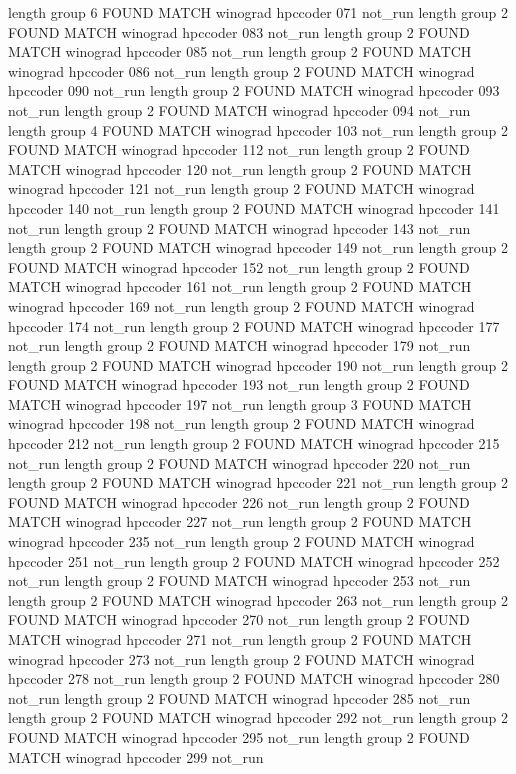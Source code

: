 length group  6
FOUND MATCH winograd hpccoder 071 not_run
length group  2
FOUND MATCH winograd hpccoder 083 not_run
length group  2
FOUND MATCH winograd hpccoder 085 not_run
length group  2
FOUND MATCH winograd hpccoder 086 not_run
length group  2
FOUND MATCH winograd hpccoder 090 not_run
length group  2
FOUND MATCH winograd hpccoder 093 not_run
length group  2
FOUND MATCH winograd hpccoder 094 not_run
length group  4
FOUND MATCH winograd hpccoder 103 not_run
length group  2
FOUND MATCH winograd hpccoder 112 not_run
length group  2
FOUND MATCH winograd hpccoder 120 not_run
length group  2
FOUND MATCH winograd hpccoder 121 not_run
length group  2
FOUND MATCH winograd hpccoder 140 not_run
length group  2
FOUND MATCH winograd hpccoder 141 not_run
length group  2
FOUND MATCH winograd hpccoder 143 not_run
length group  2
FOUND MATCH winograd hpccoder 149 not_run
length group  2
FOUND MATCH winograd hpccoder 152 not_run
length group  2
FOUND MATCH winograd hpccoder 161 not_run
length group  2
FOUND MATCH winograd hpccoder 169 not_run
length group  2
FOUND MATCH winograd hpccoder 174 not_run
length group  2
FOUND MATCH winograd hpccoder 177 not_run
length group  2
FOUND MATCH winograd hpccoder 179 not_run
length group  2
FOUND MATCH winograd hpccoder 190 not_run
length group  2
FOUND MATCH winograd hpccoder 193 not_run
length group  2
FOUND MATCH winograd hpccoder 197 not_run
length group  3
FOUND MATCH winograd hpccoder 198 not_run
length group  2
FOUND MATCH winograd hpccoder 212 not_run
length group  2
FOUND MATCH winograd hpccoder 215 not_run
length group  2
FOUND MATCH winograd hpccoder 220 not_run
length group  2
FOUND MATCH winograd hpccoder 221 not_run
length group  2
FOUND MATCH winograd hpccoder 226 not_run
length group  2
FOUND MATCH winograd hpccoder 227 not_run
length group  2
FOUND MATCH winograd hpccoder 235 not_run
length group  2
FOUND MATCH winograd hpccoder 251 not_run
length group  2
FOUND MATCH winograd hpccoder 252 not_run
length group  2
FOUND MATCH winograd hpccoder 253 not_run
length group  2
FOUND MATCH winograd hpccoder 263 not_run
length group  2
FOUND MATCH winograd hpccoder 270 not_run
length group  2
FOUND MATCH winograd hpccoder 271 not_run
length group  2
FOUND MATCH winograd hpccoder 273 not_run
length group  2
FOUND MATCH winograd hpccoder 278 not_run
length group  2
FOUND MATCH winograd hpccoder 280 not_run
length group  2
FOUND MATCH winograd hpccoder 285 not_run
length group  2
FOUND MATCH winograd hpccoder 292 not_run
length group  2
FOUND MATCH winograd hpccoder 295 not_run
length group  2
FOUND MATCH winograd hpccoder 299 not_run
